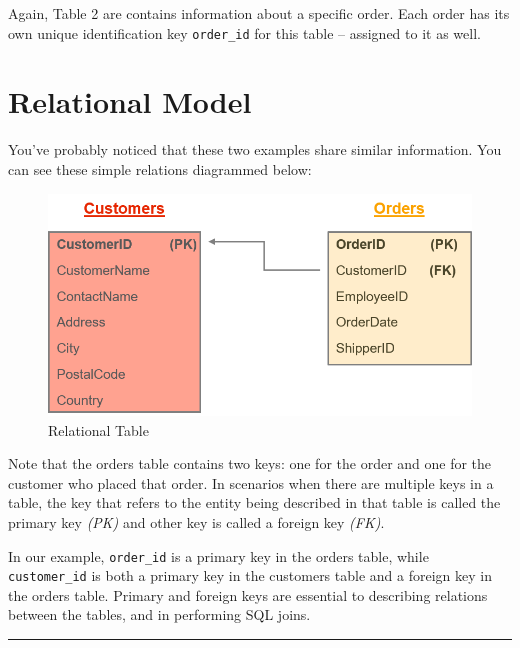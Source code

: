 \documentclass[
]{book}
\begin{document}
Again, Table 2 are contains information about a specific order. Each order has its own unique identification key \texttt{order\_id} for this table -- assigned to it as well.

\hypertarget{relational-model}{%
\section{Relational Model}\label{relational-model}}

You've probably noticed that these two examples share similar information. You can see these simple relations diagrammed below:

\begin{figure}

{\centering \includegraphics[width=1\linewidth]{./images/Bab5/relational} 

}

\caption{Relational Table}\label{fig:relational}
\end{figure}

Note that the orders table contains two keys: one for the order and one for the customer who placed that order. In scenarios when there are multiple keys in a table, the key that refers to the entity being described in that table is called the primary key \emph{(PK)} and other key is called a foreign key \emph{(FK)}.

In our example, \texttt{order\_id} is a primary key in the orders table, while \texttt{customer\_id} is both a primary key in the customers table and a foreign key in the orders table. Primary and foreign keys are essential to describing relations between the tables, and in performing SQL joins.

\begin{center}\rule{0.5\linewidth}{0.5pt}\end{center}
\end{document}
